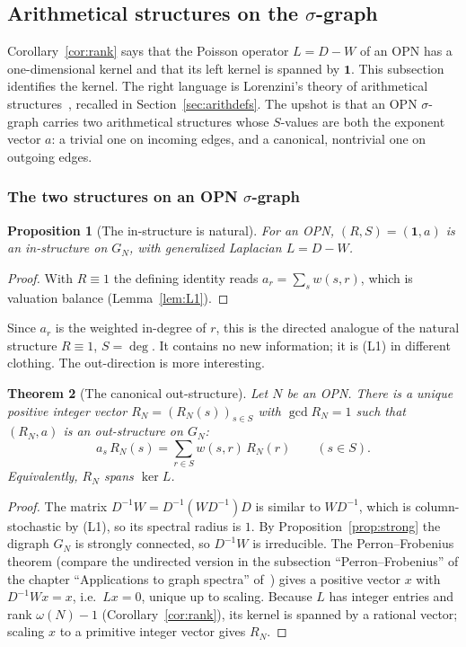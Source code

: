 \documentclass[11pt]{article}
\newtheorem{theorem}{Theorem}[section]
\newtheorem{proposition}[theorem]{Proposition}
\theoremstyle{definition}
\theoremstyle{remark}
\newcommand{\one}{\mathbf{1}}
\begin{document}
\subsection{Arithmetical structures on the $\sigma$-graph}\label{sec:arithmetical}

Corollary~\ref{cor:rank} says that the Poisson operator $L=D-W$ of an OPN
has a one-dimensional kernel and that its left kernel is spanned by $\one$.
This subsection identifies the kernel.  The right language is Lorenzini's
theory of arithmetical structures~\cite{Lorenzini}, recalled in
Section~\ref{sec:arithdefs}.  The upshot is that an
OPN $\sigma$-graph carries two arithmetical structures whose $S$-values are
both the exponent vector $a$: a trivial one on incoming edges, and a
canonical, nontrivial one on outgoing edges.

\subsubsection{The two structures on an OPN $\sigma$-graph}

\begin{proposition}[The in-structure is natural]\label{prop:instructure}
For an OPN, $(R,S)=(\one,a)$ is an in-structure on $G_N$, with generalized
Laplacian $L=D-W$.
\end{proposition}

\begin{proof}
With $R\equiv1$ the defining identity reads $a_r=\sum_s w(s,r)$, which is
valuation balance (Lemma~\ref{lem:L1}).
\end{proof}

Since $a_r$ is the weighted in-degree of $r$, this is the directed analogue
of the natural structure $R\equiv1$, $S=\deg$.  It contains no new
information; it is (L1) in different clothing.  The out-direction is more
interesting.

\begin{theorem}[The canonical out-structure]\label{thm:outstructure}
Let $N$ be an OPN.  There is a unique positive integer vector
$R_N=(R_N(s))_{s\in S}$ with $\gcd R_N=1$ such that $(R_N,a)$ is an
out-structure on $G_N$:
\[
a_s\,R_N(s)=\sum_{r\in S}w(s,r)\,R_N(r)\qquad(s\in S).
\]
Equivalently, $R_N$ spans $\ker L$.
\end{theorem}

\begin{proof}
The matrix $D^{-1}W=D^{-1}(WD^{-1})D$ is similar to $WD^{-1}$, which is
column-stochastic by (L1), so its spectral radius is $1$.  By
Proposition~\ref{prop:strong} the digraph $G_N$ is strongly connected, so
$D^{-1}W$ is irreducible.  The Perron--Frobenius theorem (compare the
undirected version in the subsection ``Perron--Frobenius'' of the chapter
``Applications to graph spectra'' of~\cite{MJappl}) gives a positive vector
$x$ with $D^{-1}Wx=x$, i.e.\ $Lx=0$, unique up to scaling.  Because $L$ has
integer entries and rank $\omega(N)-1$ (Corollary~\ref{cor:rank}), its
kernel is spanned by a rational vector; scaling $x$ to a primitive integer
vector gives $R_N$.
\end{proof}
\end{document}
